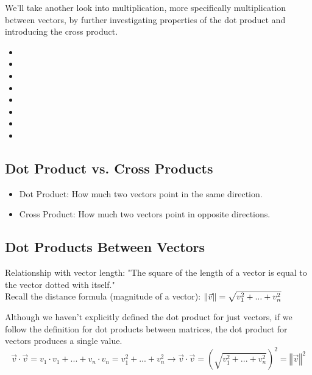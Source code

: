 
We'll take another look into multiplication, more specifically multiplication between vectors, by further investigating properties of the dot product and introducing the cross product.

\begin{itemize}
	\item {}
	\item {}
	\item {}
	\item {}
	\item {}
	\item {}
	\item {}
	\item {}
\end{itemize}


\subsection{Dot Product vs. Cross Products}\label{concept2.1}

\begin{itemize}
	\item Dot Product: How much two vectors point in the same direction.
	\item Cross Product: How much two vectors point in opposite directions.
\end{itemize}


\subsection{Dot Products Between Vectors}\label{concept2.2}
Relationship with vector length: "The square of the length of a vector is equal to the vector dotted with itself."
\\

Recall the distance formula (magnitude of a vector): $\left\Vert \vec{v} \right\Vert = \sqrt{v_{1}^{2} + ... + v_{n}^{2}}$

Although we haven't explicitly defined the dot product for just vectors, if we follow the definition for dot products between matrices, the dot product for vectors produces a single value.
\\
\begin{equation}
	\vec{v} \cdot \vec{v}  = v_1 \cdot v_1 + . . . + v_n \cdot v_n = v_1^2 + . . . + v_n^2
	\longrightarrow
	\vec{v} \cdot \vec{v} = \left(\sqrt{v_1^2 + . . . + v_n^2}\right)^2 = \left\Vert \vec{v} \right\Vert^2
\end{equation}

